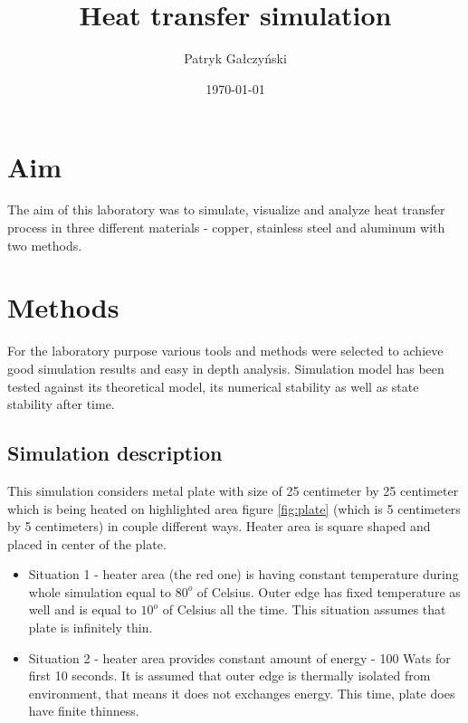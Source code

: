 \documentclass[onecolumn]{article}
\title{\spacecaps{Lab report: Lab 3-4 }\\
Heat transfer simulation\\\normalsize \spacesc{Modeling of Physical Systems} }
\author{Patryk Gałczyński}
\date{\today}
\begin{document}

\maketitle


\section{Aim}
\large
The aim of this laboratory was to simulate, visualize and analyze heat transfer process in three different materials - copper, stainless steel and aluminum with two methods.


\section{Methods}
For the laboratory purpose various tools and methods were selected to achieve good simulation results and easy in depth analysis. Simulation model has been tested against its theoretical model, its numerical stability as well as state stability after time.


\subsection{Simulation description}
This simulation considers metal plate with size of 25 centimeter by 25 centimeter which is being heated on highlighted area figure \ref{fig:plate} (which is 5 centimeters by 5 centimeters) in couple different ways. Heater area is square shaped and placed in center of the plate. 

\begin{itemize}
	\item Situation 1 - heater area (the red one) is having constant temperature during whole simulation equal to $80^{o}$ of Celsius. Outer edge has fixed temperature as well and is equal to $10^{o}$ of Celsius all the time. This situation assumes that plate is infinitely thin.
    \item Situation 2 - heater area provides constant amount of energy - 100 Wats for first 10 seconds. It is assumed that outer edge is thermally isolated from environment, that means it does not exchanges energy. This time, plate does have finite thinness. 
\end{itemize}
\end{document}
